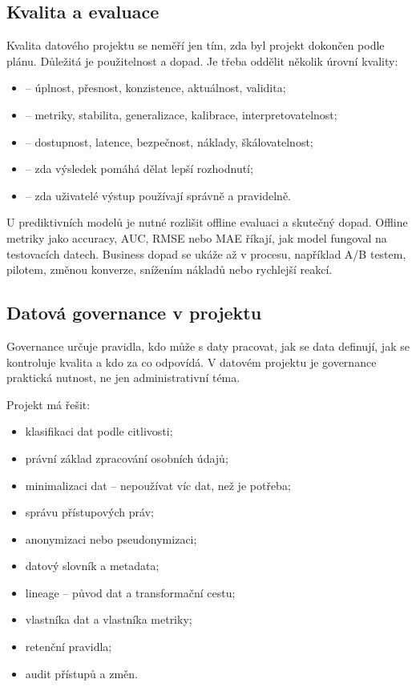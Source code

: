 \subsection{Kvalita a evaluace}
Kvalita datového projektu se neměří jen tím, zda byl projekt dokončen podle plánu. Důležitá je použitelnost a dopad. Je třeba oddělit několik úrovní kvality:
\begin{itemize}
  \item {} -- úplnost, přesnost, konzistence, aktuálnost, validita;
  \item {} -- metriky, stabilita, generalizace, kalibrace, interpretovatelnost;
  \item {} -- dostupnost, latence, bezpečnost, náklady, škálovatelnost;
  \item {} -- zda výsledek pomáhá dělat lepší rozhodnutí;
  \item {} -- zda uživatelé výstup používají správně a pravidelně.
\end{itemize}

U prediktivních modelů je nutné rozlišit offline evaluaci a skutečný dopad. Offline metriky jako accuracy, AUC, RMSE nebo MAE říkají, jak model fungoval na testovacích datech. Business dopad se ukáže až v procesu, například A/B testem, pilotem, změnou konverze, snížením nákladů nebo rychlejší reakcí.

\subsection{Datová governance v projektu}
Governance určuje pravidla, kdo může s daty pracovat, jak se data definují, jak se kontroluje kvalita a kdo za co odpovídá. V datovém projektu je governance praktická nutnost, ne jen administrativní téma.

Projekt má řešit:
\begin{itemize}
  \item klasifikaci dat podle citlivosti;
  \item právní základ zpracování osobních údajů;
  \item minimalizaci dat -- nepoužívat víc dat, než je potřeba;
  \item správu přístupových práv;
  \item anonymizaci nebo pseudonymizaci;
  \item datový slovník a metadata;
  \item lineage -- původ dat a transformační cestu;
  \item vlastníka dat a vlastníka metriky;
  \item retenční pravidla;
  \item audit přístupů a změn.
\end{itemize}

